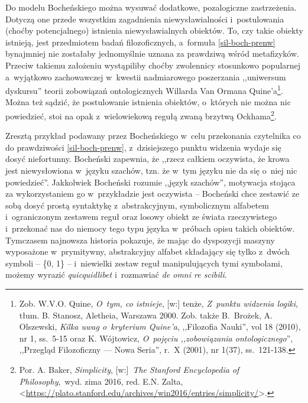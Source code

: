 Do modelu Bocheńskiego można wysuwać dodatkowe, pozalogiczne zastrzeżenia. Dotyczą one przede wszystkim zagadnienia niewysławialności i~postulowania (choćby potencjalnego) istnienia niewysławialnych obiektów. To, czy takie obiekty istnieją, jest przedmiotem badań filozoficznych, a~formuła \eqref{sil-boch-prenw} bynajmniej nie zostałaby jednomyślnie uznana za prawdziwą wśród metafizyków. Przeciw takiemu założeniu wystąpiliby choćby zwolennicy stosunkowo popularnej a~wyjątkowo zachowawczej w~kwestii nadmiarowego poszerzania ,,uniwersum dyskursu'' teorii zobowiązań ontologicznych Willarda Van Ormana Quine'a\footnote{Zob. W.V.O. Quine, \textit{O~tym, co istnieje}, [w:] tenże, \textit{Z~punktu widzenia logiki}, tłum. B. Stanosz, Aletheia, Warszawa 2000. Zob. także B.~Brożek, A. Olszewski, \textit{Kilka uwag o~kryterium Quine'a}, ,,Filozofia Nauki'', vol 18 (2010), nr 1, ss.~5-15 oraz K. Wójtowicz, \textit{O~pojęciu ,,zobowiązania ontologicznego}'', ,,Przegląd Filozoficzny — Nowa Seria'', r.~X (2001), nr 1(37), ss.~121-138.}. Można też sądzić, że postulowanie istnienia obiektów, o~których nie można nic powiedzieć, stoi na opak z~wielowiekową regułą zwaną brzytwą Ockhama\footnote{Por. A. Baker, \textit{Simplicity}, [w:]~\textit{The Stanford Encyclopedia of Philosophy},~wyd. zima 2016, red. E.N. Zalta, {\textless}\url{https://plato.stanford.edu/archives/win2016/entries/simplicity/}{\textgreater}.}.

Zresztą przykład podawany przez Bocheńskiego w~celu przekonania czytelnika co do prawdziwości \eqref{sil-boch-prenw}, z~dzisiejszego punktu widzenia wydaje się dosyć niefortunny. Bocheński zapewnia, że ,,rzecz całkiem oczywista, że krowa jest niewysłowiona w~języku szachów, tzn. że w~tym języku nie da się o~niej nic powiedzieć''. Jakkolwiek Bocheński rozumie ,,język szachów'', motywacja stojąca za wykorzystaniem go w~przykładzie jest oczywista -- Bocheński chce zestawić ze sobą dosyć prostą syntaktykę z~abstrakcyjnym, symbolicznym alfabetem i~ograniczonym zestawem reguł oraz losowy obiekt ze świata rzeczywistego i~przekonać nas do niemocy tego typu języka w~próbach opisu takich obiektów. Tymczasem najnowsza historia pokazuje, że mając do dyspozycji maszyny wyposażone w~prymitywny, abstrakcyjny alfabet składający się tylko z~dwóch symboli -- \{0, 1\} -- i~niewielki zestaw reguł manipulujących tymi symbolami, możemy wyrazić \textit{quicquidlibet} i~rozmawiać \textit{de omni re scibili}.


